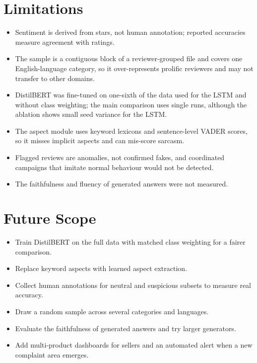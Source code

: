 \documentclass[12pt,a4paper]{report}
\begin{document}
\section{Limitations}
\begin{itemize}
\item Sentiment is derived from stars, not human annotation; reported accuracies measure agreement with ratings.
\item The sample is a contiguous block of a reviewer-grouped file and covers one English-language category, so it over-represents prolific reviewers and may not transfer to other domains.
\item DistilBERT was fine-tuned on one-sixth of the data used for the LSTM and without class weighting; the main comparison uses single runs, although the ablation shows small seed variance for the LSTM.
\item The aspect module uses keyword lexicons and sentence-level VADER scores, so it misses implicit aspects and can mis-score sarcasm.
\item Flagged reviews are anomalies, not confirmed fakes, and coordinated campaigns that imitate normal behaviour would not be detected.
\item The faithfulness and fluency of generated answers were not measured.
\end{itemize}

\section{Future Scope}
\begin{itemize}
\item Train DistilBERT on the full data with matched class weighting for a fairer comparison.
\item Replace keyword aspects with learned aspect extraction.
\item Collect human annotations for neutral and suspicious subsets to measure real accuracy.
\item Draw a random sample across several categories and languages.
\item Evaluate the faithfulness of generated answers and try larger generators.
\item Add multi-product dashboards for sellers and an automated alert when a new complaint area emerges.
\end{itemize}
\end{document}
